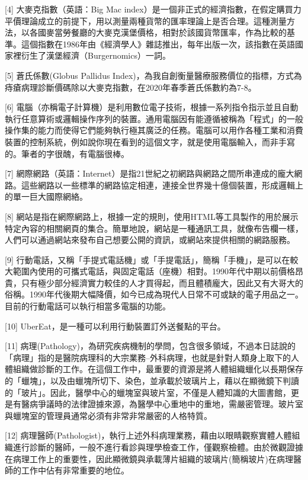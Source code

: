 \documentclass[a5paper, 10pt
]{book}
\begin{document}
{[}4{]} 大麥克指數（英語：Big Mac
index）是一個非正式的經濟指數，在假定購買力平價理論成立的前提下，用以測量兩種貨幣的匯率理論上是否合理。這種測量方法，以各國麥當勞餐廳的大麥克漢堡價格，相對於該國貨幣匯率，作為比較的基準。這個指數在1986年由《經濟學人》雜誌推出，每年出版一次，該指數在英語國家裡衍生了漢堡經濟（Burgernomics）一詞。

{[}5{]} 蒼氏係數(Globus Pallidus
Index)，為我自創衡量醫療服務價位的指標，方式為痔瘡病理診斷價碼除以大麥克指數，在2020年春季蒼氏係數約為7-8。

{[}6{]}
電腦（亦稱電子計算機）是利用數位電子技術，根據一系列指令指示並且自動執行任意算術或邏輯操作序列的裝置。通用電腦因有能遵循被稱為「程式」的一般操作集的能力而使得它們能夠執行極其廣泛的任務。電腦可以用作各種工業和消費裝置的控制系統，例如說你現在看到的這個文字，就是使用電腦輸入，而非手寫的。筆者的字很醜，有電腦很棒。

{[}7{]}
網際網路（英語：Internet）是指21世紀之初網路與網路之間所串連成的龐大網路。這些網路以一些標準的網路協定相連，連接全世界幾十億個裝置，形成邏輯上的單一巨大國際網絡。

{[}8{]}
網站是指在網際網路上，根據一定的規則，使用HTML等工具製作的用於展示特定內容的相關網頁的集合。簡單地說，網站是一種通訊工具，就像布告欄一樣，人們可以通過網站來發布自己想要公開的資訊，或網站來提供相關的網路服務。

{[}9{]}
行動電話，又稱「手提式電話機」或「手提電話」，簡稱「手機」，是可以在較大範圍內使用的可攜式電話，與固定電話（座機）相對。1990年代中期以前價格昂貴，只有極少部分經濟實力較佳的人才買得起，而且體積龐大，因此又有大哥大的俗稱。1990年代後期大幅降價，如今已成為現代人日常不可或缺的電子用品之一。目前的行動電話可以執行相當多電腦的功能。

{[}10{]} UberEat，是一種可以利用行動裝置訂外送餐點的平台。

{[}11{]}
病理(Pathology)，為研究疾病機制的學問，包含很多領域，不過本日誌說的「病理」指的是醫院病理科的大宗業務--外科病理，也就是針對人類身上取下的人體組織做診斷的工作。在這個工作中，最重要的資源是將人體組織蠟化以長期保存的「蠟塊」，以及由蠟塊所切下、染色，並承載於玻璃片上，藉以在顯微鏡下判讀的「玻片」。因此，醫學中心的蠟塊室與玻片室，不僅是人體知識的大圖書館，更是有醫病爭議時的法律證據來源，為醫學中心重地中的重地，需嚴密管理。玻片室與蠟塊室的管理員通常必須有非常非常嚴密的人格特質。

{[}12{]}
病理醫師(Pathologist)，執行上述外科病理業務，藉由以眼睛觀察實體人體組織進行診斷的醫師，一般不進行看診與理學檢查工作，僅觀察檢體。由於微觀證據在病理工作上的重要性，因此顯微鏡與承載薄片組織的玻璃片(簡稱玻片)在病理醫師的工作中佔有非常重要的地位。
\end{document}
